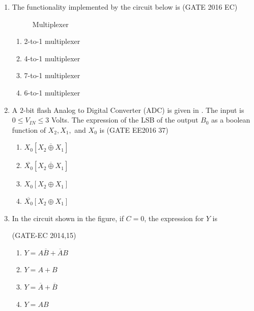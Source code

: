 \begin{enumerate}
\item The functionality implemented by the circuit below is \hfill{(GATE 2016 EC)}

\begin{figure}[!ht]
\centering

\label{fig:gate_ec_2016_43}
\caption{Multiplexer}
\end{figure}

\begin{enumerate}[label=\Alph*.]
\item 2-to-1 multiplexer
\item 4-to-1 multiplexer
\item 7-to-1 multiplexer
\item 6-to-1 multiplexer
\end{enumerate}
\item A $2$-bit flash Analog to Digital Converter (ADC) is given in . The input is $0 \leq V_{IN} \leq 3$ Volts. The expression of the LSB of the output $B_0$ as a boolean function of $X_2,X_1,$ and $X_0$ is \hfill(GATE EE2016 37)
\begin{figure}[H]
\centering

\caption{}
\label{EE2016_37_fig1}
\end{figure}
\begin{enumerate}
\item $X_0 \left[ \overline {X_2 \oplus X_1} \right]$
\item $\overline {X_0} \left[ \overline {X_2 \oplus X_1} \right]$
\item $X_0 \left[ X_2 \oplus X_1 \right]$
\item $\overline{X_0} \left[ X_2 \oplus X_1 \right]$
\end{enumerate}
\item In the circuit shown in the figure, if $C = 0$, the expression for $Y$ is

\hfill (GATE-EC 2014,15)

\begin{figure}[H]
    \centering
	
	\caption{} 
	\label{}
	
\end{figure}


\begin{enumerate}
\item  $Y= A\overline{B}+ \overline{A}B $ 
\item  $Y=A+B$
\item  $Y=\overline{A}+\overline{B}$
\item  $Y=AB$
\end{enumerate}



\end{enumerate}
